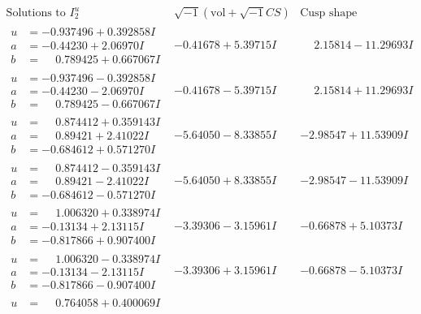 \documentclass[1p]{elsarticle_modified}
\theoremstyle{definition}
\newcommand{\I}{\sqrt{-1}}
\begin{document}
$$\begin{array}{c|c|c}  
\text{Solutions to }I^u_{2}& \I (\text{vol} + \sqrt{-1}CS) & \text{Cusp shape}\\
 \hline 
\begin{aligned}
u &= -0.937496 + 0.392858 I \\
a &= -0.44230 + 2.06970 I \\
b &= \phantom{-}0.789425 + 0.667067 I\end{aligned}
 & -0.41678 + 5.39715 I & \phantom{-}2.15814 - 11.29693 I \\ \hline\begin{aligned}
u &= -0.937496 - 0.392858 I \\
a &= -0.44230 - 2.06970 I \\
b &= \phantom{-}0.789425 - 0.667067 I\end{aligned}
 & -0.41678 - 5.39715 I & \phantom{-}2.15814 + 11.29693 I \\ \hline\begin{aligned}
u &= \phantom{-}0.874412 + 0.359143 I \\
a &= \phantom{-}0.89421 + 2.41022 I \\
b &= -0.684612 + 0.571270 I\end{aligned}
 & -5.64050 - 8.33855 I & -2.98547 + 11.53909 I \\ \hline\begin{aligned}
u &= \phantom{-}0.874412 - 0.359143 I \\
a &= \phantom{-}0.89421 - 2.41022 I \\
b &= -0.684612 - 0.571270 I\end{aligned}
 & -5.64050 + 8.33855 I & -2.98547 - 11.53909 I \\ \hline\begin{aligned}
u &= \phantom{-}1.006320 + 0.338974 I \\
a &= -0.13134 + 2.13115 I \\
b &= -0.817866 + 0.907400 I\end{aligned}
 & -3.39306 - 3.15961 I & -0.66878 + 5.10373 I \\ \hline\begin{aligned}
u &= \phantom{-}1.006320 - 0.338974 I \\
a &= -0.13134 - 2.13115 I \\
b &= -0.817866 - 0.907400 I\end{aligned}
 & -3.39306 + 3.15961 I & -0.66878 - 5.10373 I \\ \hline\begin{aligned}
u &= \phantom{-}0.764058 + 0.400069 I \\

\end{aligned}
\end{array}$$
\end{document}
